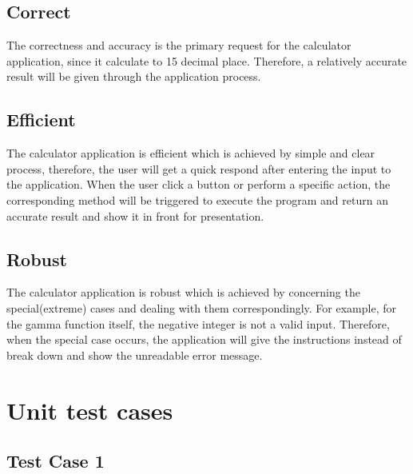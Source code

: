 \documentclass[a4paper, 11pt]{article}
\begin{document}
\subsection{Correct}
\indent\indent The correctness and accuracy is the primary request for the calculator application, since it calculate to 15 decimal place. Therefore, a relatively accurate result will be given through the application process.
\subsection{Efficient}
\indent\indent The calculator application is efficient which is achieved by simple and clear process, therefore, the user will get a quick respond after entering the input to the application.
When the user click a button or perform a specific action, the corresponding method will be triggered to execute the program and return an accurate result and show it in front for presentation.

\subsection{Robust}
\indent\indent The calculator application is robust which is achieved by concerning the special(extreme) cases and dealing with them correspondingly. For example, for the gamma function itself, the negative integer is not a valid input. Therefore, when the special case occurs, the application will give the instructions instead of break down and show the unreadable error message.

\newpage

\section{Unit test cases}

\subsection{Test Case 1}
\end{document}
